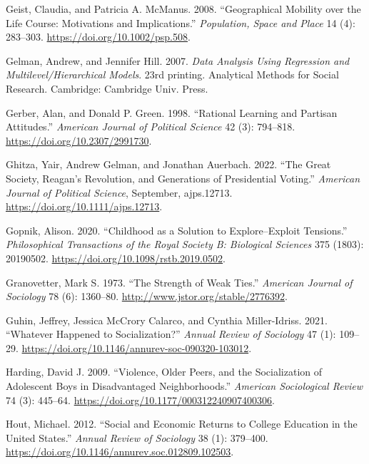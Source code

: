 \documentclass[
  12pt,
]{article}
\newlength{\cslhangindent}
\newlength{\cslentryspacingunit} %
\newenvironment{CSLReferences}[2] %
 {%
  \setlength{\parindent}{0pt}
  \ifodd #1
  \let\oldpar\par
  \def\par{\hangindent=\cslhangindent\oldpar}
  \fi
  \setlength{\parskip}{#2\cslentryspacingunit}
 }%
 {}
\begin{document}
\begin{CSLReferences}{1}{0}
\leavevmode{}%
Geist, Claudia, and Patricia A. McManus. 2008. {``Geographical Mobility over the Life Course: Motivations and Implications.''} \emph{Population, Space and Place} 14 (4): 283--303. \url{https://doi.org/10.1002/psp.508}.

\leavevmode{}%
Gelman, Andrew, and Jennifer Hill. 2007. \emph{Data Analysis Using Regression and Multilevel/Hierarchical Models}. 23rd printing. Analytical Methods for Social Research. Cambridge: Cambridge Univ. Press.

\leavevmode{}%
Gerber, Alan, and Donald P. Green. 1998. {``Rational {Learning} and {Partisan} {Attitudes}.''} \emph{American Journal of Political Science} 42 (3): 794--818. \url{https://doi.org/10.2307/2991730}.

\leavevmode{}%
Ghitza, Yair, Andrew Gelman, and Jonathan Auerbach. 2022. {``The {Great} {Society}, {Reagan}'s {Revolution}, and {Generations} of {Presidential} {Voting}.''} \emph{American Journal of Political Science}, September, ajps.12713. \url{https://doi.org/10.1111/ajps.12713}.

\leavevmode{}%
Gopnik, Alison. 2020. {``Childhood as a Solution to Explore--Exploit Tensions.''} \emph{Philosophical Transactions of the Royal Society B: Biological Sciences} 375 (1803): 20190502. \url{https://doi.org/10.1098/rstb.2019.0502}.

\leavevmode{}%
Granovetter, Mark S. 1973. {``The {Strength} of {Weak} {Ties}.''} \emph{American Journal of Sociology} 78 (6): 1360--80. \url{http://www.jstor.org/stable/2776392}.

\leavevmode{}%
Guhin, Jeffrey, Jessica McCrory Calarco, and Cynthia Miller-Idriss. 2021. {``Whatever {Happened} to {Socialization}?''} \emph{Annual Review of Sociology} 47 (1): 109--29. \url{https://doi.org/10.1146/annurev-soc-090320-103012}.

\leavevmode{}%
Harding, David J. 2009. {``Violence, {Older} {Peers}, and the {Socialization} of {Adolescent} {Boys} in {Disadvantaged} {Neighborhoods}.''} \emph{American Sociological Review} 74 (3): 445--64. \url{https://doi.org/10.1177/000312240907400306}.

\leavevmode{}%
Hout, Michael. 2012. {``Social and {Economic} {Returns} to {College} {Education} in the {United} {States}.''} \emph{Annual Review of Sociology} 38 (1): 379--400. \url{https://doi.org/10.1146/annurev.soc.012809.102503}.


\end{CSLReferences}
\end{document}
